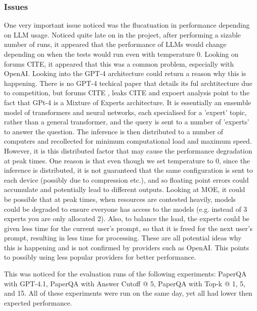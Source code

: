 \subsubsection{Issues}
One very important issue noticed was the flucatuation in performance depending on LLM usage.
Noticed quite late on in the project, after performing a sizable number of runs, it appeared that the performance of LLMs would change depending on when the tests would run even with temperature 0. Looking on forums CITE, it appeared that this was a common problem, especially with OpenAI. Looking into the GPT-4 architecture could return a reason why this is happening. There is no GPT-4 techical paper that details its ful archtitecture due to competition, but forums CITE , leaks CITE  and expoert analysis point to the fact that GPt-4 is a Mixture of Experts architecture. It is essentially an ensemble model of transformers and neural networks, each specialised for a 'expert' topic, rather than a general transformer, and the query is sent to a number of 'experts' to answer the question. The inference is then distributed to a number of computers and recollected for minimum computational load and maximum speed. However, it is this distributed factor that may cause the performance degradation at peak times. One reason is that even though we set temperature to 0, since the inference is distributed, it is not guaranteed that the same configuration is sent to each device (possibly due to compression etc.), and so floating point errors could accumulate and potentially lead to different outputs. Looking at MOE, it could be possible that at peak times, when resources are contested heavily, models could be degraded to ensure everyone has access to the models (e.g. instead of 3 experts you are only allocated 2). Also, to balance the load, the experts could be given less time for the current user's prompt, so that it is freed for the next user's prompt, resulting in less time for processing. These are all potential ideas why this is happening and is not confirmed by providers such as OpenAI. This points to possibly using less popular providers for better performance. 

This was noticed for the evaluation runs of the following experiments: PaperQA with GPT-4.1, PaperQA with Answer Cutoff @ 5, PaperQA with Top-k @ 1, 5, and 15. All of these experiments were run on the same day, yet all had lower then expected performance. 

